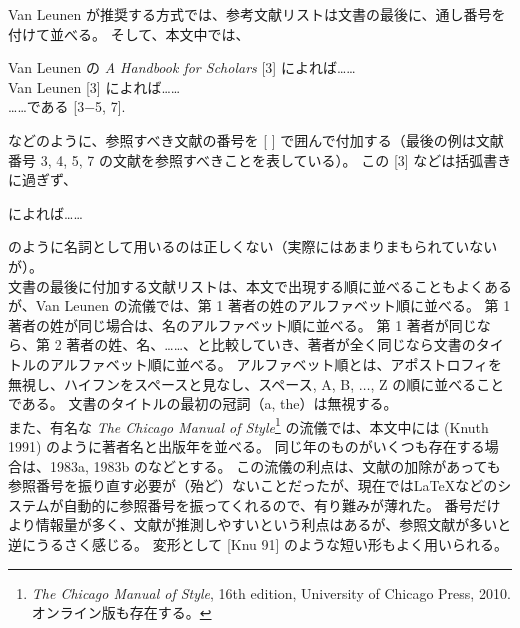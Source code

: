 Van Leunen が推奨する方式では、参考文献リストは文書の最後に、通し番号を付けて並べる。
そして、本文中では、
\begin{mdframed}[roundcorner=0.50zw,leftmargin=3.00zw,rightmargin=3.00zw,skipabove=0.40zw,skipbelow=0.40zw,innertopmargin=4.00pt,innerbottommargin=4.00pt,innerleftmargin=5.00pt,innerrightmargin=5.00pt,linecolor=gray!100,linewidth=0.50pt,backgroundcolor=gray!00]
  Van Leunen の \emph{A Handbook for Scholars} [3] によれば……\\
  Van Leunen [3] によれば……\\
  ……である [3$-$5, 7].
\end{mdframed}
などのように、参照すべき文献の番号を [ ] で囲んで付加する（最後の例は文献番号 3, 4, 5, 7 の文献を参照すべきことを表している）。
この [3] などは括弧書きに過ぎず、
\begin{mdframed}[roundcorner=0.50zw,leftmargin=3.00zw,rightmargin=3.00zw,skipabove=0.40zw,skipbelow=0.40zw,innertopmargin=4.00pt,innerbottommargin=4.00pt,innerleftmargin=5.00pt,innerrightmargin=5.00pt,linecolor=gray!100,linewidth=0.50pt,backgroundcolor=gray!00]
  [3] によれば……
\end{mdframed}
のように名詞として用いるのは正しくない（実際にはあまりまもられていないが）。\\

文書の最後に付加する文献リストは、本文で出現する順に並べることもよくあるが、Van Leunen の流儀では、第 1 著者の姓のアルファベット順に並べる。
第 1 著者の姓が同じ場合は、名のアルファベット順に並べる。
第 1 著者が同じなら、第 2 著者の姓、名、……、と比較していき、著者が全く同じなら文書のタイトルのアルファベット順に並べる。
アルファベット順とは、アポストロフィを無視し、ハイフンをスペースと見なし、スペース, A, B, $\ldots$, Z の順に並べることである。
文書のタイトルの最初の冠詞（a, the）は無視する。\\

また、有名な \emph{The Chicago Manual of Style}\footnote{\emph{The Chicago Manual of Style}, 16th edition, University of Chicago Press, 2010. オンライン版も存在する。} の流儀では、本文中には (Knuth 1991) のように著者名と出版年を並べる。
同じ年のものがいくつも存在する場合は、1983a, 1983b のなどとする。\enlargethispage{+0.10zw}
この流儀の利点は、文献の加除があっても参照番号を振り直す必要が（殆ど）ないことだったが、現在では\LaTeX{}などのシステムが自動的に参照番号を振ってくれるので、有り難みが薄れた。
番号だけより情報量が多く、文献が推測しやすいという利点はあるが、参照文献が多いと逆にうるさく感じる。
変形として [Knu 91] のような短い形もよく用いられる。\\

